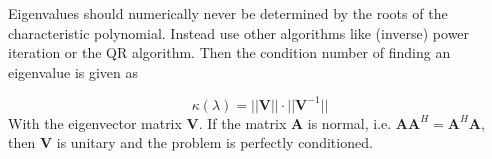 \documentclass[
    a4paper,
    11pt
]{article}
\begin{document}
Eigenvalues should numerically never be determined by the roots of the
characteristic polynomial. Instead use other algorithms like (inverse) power
iteration or the QR algorithm. Then the condition number of finding an
eigenvalue is given as

\begin{equation}
    \kappa(\lambda) = ||\mathbf{V}||\cdot||\mathbf{V}^{-1}||
\end{equation}
With the eigenvector matrix $\mathbf{V}$. If the matrix $\mathbf{A}$ is normal,
i.e. $\mathbf{AA}^H = \mathbf{A}^H \mathbf{A}$, then $\mathbf{V}$ is unitary and
the problem is perfectly conditioned.
\end{document}
